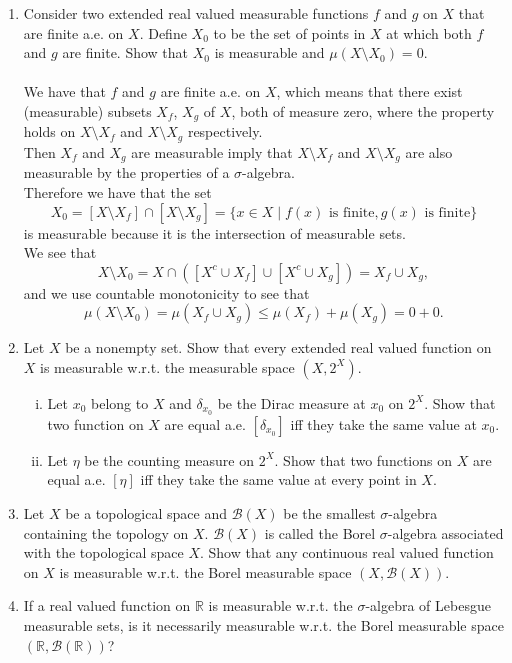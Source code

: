 \begin{enumerate}
    \item Consider two extended real valued measurable functions $f$ and $g$ on $X$ that are finite a.e. on $X$.
    Define $X_0$ to be the set of points in $X$ at which both $f$ and $g$ are finite.
    Show that $X_0$ is measurable and $\mu(X\setminus X_0)=0$.\\
    \\We have that $f$ and $g$ are finite a.e. on $X$, which means that there exist (measurable) subsets $X_f$, $X_g$ of $X$, both of measure zero, where the property holds on $X\setminus X_f$ and $X\setminus X_g$ respectively.
    \\Then $X_f$ and $X_g$ are measurable imply that $X\setminus X_f$ and $X\setminus X_g$ are also measurable by the properties of a $\sigma$-algebra.
    \\Therefore we have that the set
    \[
        X_0=[X\setminus X_f]\cap[X\setminus X_g]=\{x\in X\mid f(x)\text{ is finite},g(x)\text{ is finite}\}
    \]
    is measurable because it is the intersection of measurable sets.
    \\We see that 
    \[
        X\setminus X_0=X\cap([X^c\cup X_f]\cup[X^c\cup X_g])=X_f\cup X_g,
    \]
    and we use countable monotonicity to see that
    \[
        \mu(X\setminus X_0)=\mu(X_f\cup X_g)\le\mu(X_f)+\mu(X_g)=0+0.
    \]
    \item Let $X$ be a nonempty set.
    Show that every extended real valued function on $X$ is measurable w.r.t. the measurable space $(X,2^X)$.
    \begin{enumerate}[(i)]
        \item Let $x_0$ belong to $X$ and $\delta_{x_0}$ be the Dirac measure at $x_0$ on $2^X$.
        Show that two function on $X$ are equal a.e. $[\delta_{x_0}]$ iff they take the same value at $x_0$.
        \item Let $\eta$ be the counting measure on $2^X$.
        Show that two functions on $X$ are equal a.e. $[\eta]$ iff they take the same value at every point in $X$.
    \end{enumerate}
    \item Let $X$ be a topological space and $\mathcal{B}(X)$ be the smallest $\sigma$-algebra containing the topology on $X$.
    $\mathcal{B}(X)$ is called the Borel $\sigma$-algebra associated with the topological space $X$.
    Show that any continuous real valued function on $X$ is measurable w.r.t. the Borel measurable space $(X,\mathcal{B}(X))$.
    \item If a real valued function on $\mathbb{R}$ is measurable w.r.t. the $\sigma$-algebra of Lebesgue measurable sets, is it necessarily measurable w.r.t. the Borel measurable space $(\mathbb{R},\mathcal{B}(\mathbb{R}))$?

\end{enumerate}
